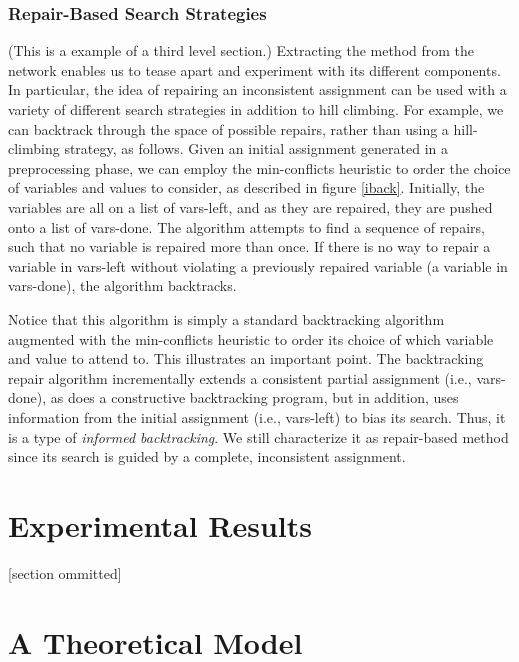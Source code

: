 \subsubsection{Repair-Based Search Strategies}

(This is a example of a third level section.)
Extracting the method from the network enables us
to tease apart and experiment with its different components.
In particular, the idea of repairing an inconsistent assignment
can be used with a variety of different search strategies
in addition to hill climbing.
For example, we can backtrack through the space of possible repairs,
rather than using a hill-climbing strategy, as follows.
Given an initial assignment generated in a preprocessing phase, 
we can employ the min-conflicts
heuristic to order the choice of variables and values to consider,
as described in figure \ref{iback}.
Initially, the variables are all on a list
of {\sc vars-left}, and as they are repaired, they are pushed onto a 
list of {\sc vars-done}. 
The algorithm attempts
to find a sequence of repairs, such that no variable is repaired more than
once. If there is no way to repair a variable in {\sc vars-left} without
violating a previously repaired variable (a variable in {\sc vars-done}),
the algorithm backtracks.

Notice that this algorithm is simply a standard
backtracking algorithm augmented with the min-conflicts heuristic to
order its choice of which variable and value to attend to.  This
illustrates an important point. The backtracking repair algorithm
incrementally extends a consistent partial assignment (i.e., {\sc
vars-done}), as does a constructive backtracking program, but in addition,
uses information from the initial assignment (i.e., {\sc vars-left})
to bias its search. Thus, it is a type of {\em informed backtracking}.
We still characterize it as repair-based method since its search
is guided by a complete, inconsistent assignment.


\section{Experimental Results}

\label{results}

 [section ommitted]

\section{A Theoretical Model}
\label{analysis}

